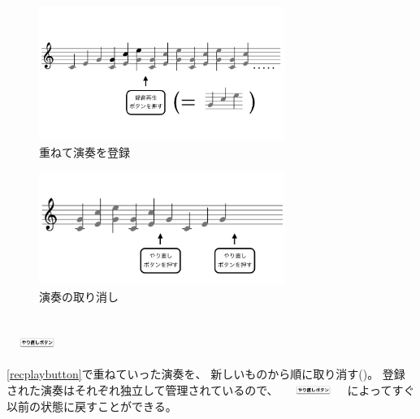 \begin{figure}[tb]
\includegraphics[width=8cm,bb=0 0 1054 481]{images/rp3.png}
\centering
\caption{重ねて演奏を登録}
\label{recplay3}
\end{figure}

\begin{figure}[tb]
\includegraphics[width=8cm,bb=0 0 1054 481]{images/rp4.png}
\centering
\caption{演奏の取り消し}
\label{recplay4}
\end{figure}

\subsection{\protect\includegraphics[height=3mm,width=20mm,bb=3 23 360 80]{images/undobutton.png}}

\ref{recplaybutton}で重ねていった演奏を、
新しいものから順に取り消す()。
登録された演奏はそれぞれ独立して管理されているので、
\includegraphics[height=3mm,width=20mm,bb=3 23 360 80]{images/undobutton.png}
によってすぐ以前の状態に戻すことができる。
